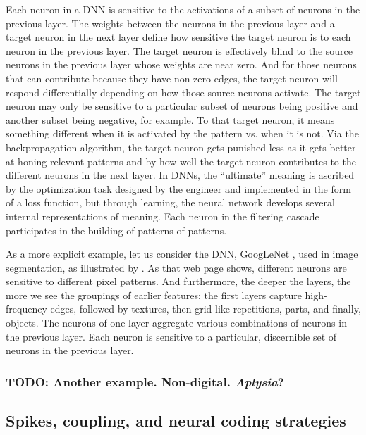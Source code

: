 Each neuron in a DNN is sensitive to the activations of a subset of neurons in the previous layer.
The weights between the neurons in the previous layer and a target neuron in the next layer define how sensitive the target neuron is to each neuron in the previous layer.
The target neuron is effectively blind to the source neurons in the previous layer whose weights are near zero.
And for those neurons that can contribute because they have non-zero edges, the target neuron will respond differentially depending on how those source neurons activate.
The target neuron may only be sensitive to a particular subset of neurons being positive and another subset being negative, for example.
To that target neuron, it means something different when it is activated by the pattern vs. when it is not.
Via the backpropagation algorithm, the target neuron gets punished less as it gets better at honing relevant patterns and by how well the target neuron contributes to the different neurons in the next layer.
In DNNs, the ``ultimate'' meaning is ascribed by the optimization task designed by the engineer and implemented in the form of a loss function, but through learning, the neural network develops several internal representations of meaning.
Each neuron in the filtering cascade participates in the building of patterns of patterns.

As a more explicit example, let us consider the DNN, GoogLeNet \cite{szegedyGoingDeeperConvolutions2015}, used in image segmentation, as illustrated by \citet{olahFeatureVisualization2017}.
As that web page shows, different neurons are sensitive to different pixel patterns.
And furthermore, the deeper the layers, the more we see the groupings of earlier features: the first layers capture high-frequency edges, followed by textures, then grid-like repetitions, parts, and finally, objects.
The neurons of one layer aggregate various combinations of neurons in the previous layer.
Each neuron is sensitive to a particular, discernible set of neurons in the previous layer.

\subsubsection{TODO: Another example. Non-digital. \emph{Aplysia}?}

\subsection{Spikes, coupling, and neural coding strategies}

